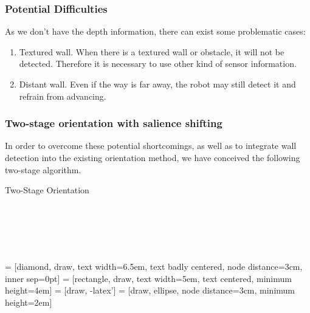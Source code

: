 \documentclass[a4paper]{scrartcl}
\begin{document}
\subsubsection{Potential Difficulties}
As we don't have the depth information, there can exist some problematic cases:
\begin{enumerate}
    \item Textured wall. When there is a textured wall or obstacle, it will not be detected. Therefore it is necessary to use other kind of sensor information.
    \item Distant wall. Even if the way is far away, the robot may still detect it and refrain from advancing.
\end{enumerate}

\subsubsection{Two-stage orientation with salience shifting}
In order to overcome these potential shortcomings, as well as to integrate wall detection into the existing orientation method, we have conceived the following two-stage algorithm. 

\begin{listing}[H]
\caption{Two-Stage Orientation}
\begin{verbatim}



    
\end{verbatim}
\end{listing}

 = [diamond, draw, 
    text width=6.5em, text badly centered, node distance=3cm, inner sep=0pt]
 = [rectangle, draw, 
    text width=5em, text centered, minimum height=4em]
 = [draw, -latex']
 = [draw, ellipse, node distance=3cm,
    minimum height=2em]
\end{document}
